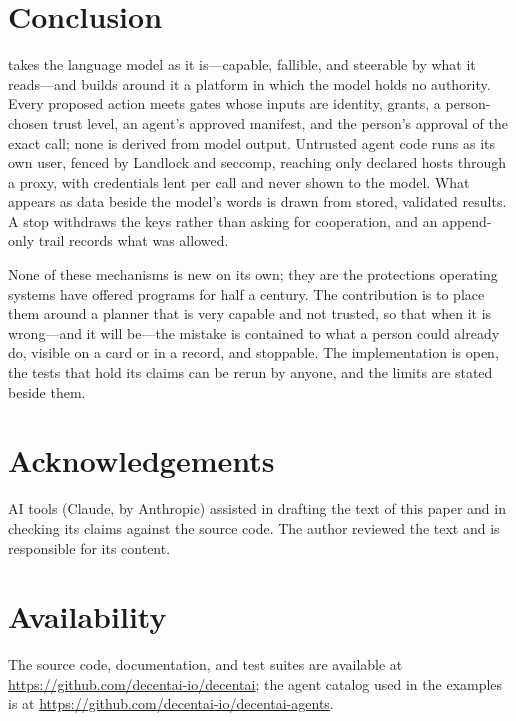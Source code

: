 \section{Conclusion}
\label{sec:conclusion}

\sys{} takes the language model as it is---capable, fallible, and
steerable by what it reads---and builds around it a platform in which
the model holds no authority. Every proposed action meets gates whose
inputs are identity, grants, a person-chosen trust level, an agent's
approved manifest, and the person's approval of the exact call; none is
derived from model output. Untrusted agent code runs as its own user,
fenced by Landlock and seccomp, reaching only declared hosts through a
proxy, with credentials lent per call and never shown to the model.
What appears as data beside the model's words is drawn from stored,
validated results. A stop withdraws the keys rather than asking for
cooperation, and an append-only trail records what was allowed.

None of these mechanisms is new on its own; they are the protections
operating systems have offered programs for half a century. The
contribution is to place them around a planner that is very capable and
not trusted, so that when it is wrong---and it will be---the mistake is
contained to what a person could already do, visible on a card or in a
record, and stoppable. The implementation is open, the tests that hold
its claims can be rerun by anyone, and the limits are stated beside
them.

\section*{Acknowledgements}
AI tools (Claude, by Anthropic) assisted in drafting the text of this
paper and in checking its claims against the source code. The author
reviewed the text and is responsible for its content.

\section*{Availability}
The source code, documentation, and test suites are available at
\url{https://github.com/decentai-io/decentai}; the agent catalog used in
the examples is at \url{https://github.com/decentai-io/decentai-agents}.
